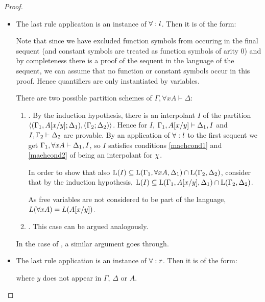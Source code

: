 \begin{proof}
\begin{description}
			\begin{itemize}
				\item The last rule application is an instance of $\operatorname{\forall}:l$. Then it is of the form:
					\begin{prooftree}
					\end{prooftree}
					Note that since we have excluded function symbols from occuring in the final sequent (and constant symbols are treated as function symbols of arity 0) and
					by completeness there is a proof of the sequent in the language of the sequent, we can assume that no function or constant symbols occur in this proof.
					Hence quantifiers are only instantiated by variables.

					There are two possible partition schemes of $\Gamma, \forall x A \vdash \Delta$:
					\begin{enumerate}
						\item \parti{\Gamma_1, \forall x A}{\Delta_1}{\Gamma_2}{\Delta_2}.
							By the induction hypothesis, there is an interpolant $I$ of the partition $ \langle (\Gamma_1, A[x/y]; \Delta_1), (\Gamma_2; \Delta_2)\rangle $.
							Hence for $I$, 
							$\Gamma_1, A[x/y] \vdash \Delta_1, I$ and  
							$I, \Gamma_2 \vdash \Delta_2$ are provable.
							By an application of $\operatorname{\forall}:l$ to the first sequent we get $\Gamma_1, \forall x A\vdash \Delta_1, I$, so $I$ satisfies conditions \ref{maehcond1} and \ref{maehcond2} of being an interpolant for $\chi$.

							In order to show that also $\operatorname{L}(I) \subseteq \operatorname{L}(\Gamma_1, \forall x A, \Delta_1) \cap \operatorname{L}(\Gamma_2, \Delta_2)$, consider that by the induction hypothesis, 
							$\operatorname{L}(I) \subseteq \operatorname{L}(\Gamma_1, A[x/y], \Delta_1) \cap \operatorname{L}(\Gamma_2, \Delta_2)$.

							As free variables are not considered to be part of the language, $L(\forall x A) = L(A[x/y])$.


						\item \parti{\Gamma_1}{\Delta_1}{\Gamma_2, \forall x A}{\Delta_2}.
							This case can be argued analogously.
					\end{enumerate}

					In the case of , a similar argument goes through.

				\item The last rule application is an instance of $\operatorname{\forall}:r$. Then it is of the form:\nopagebreak
					\begin{prooftree}
						\Axiomm{\Gamma\fCenter \Delta, A\subst{x/y} }
						\RightLabelm{\lkrule{\forall}{r}}
						\UnaryInfm{\Gamma\fCenter \Delta, \forall x A }
					\end{prooftree}
					where $y$ does not appear in $\Gamma$, $\Delta$ or $A$.


\end{itemize}
\end{description}
\end{proof}
